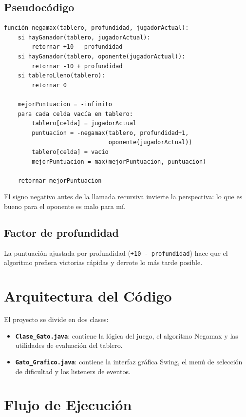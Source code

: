 \documentclass[12pt,a4paper]{article}
\begin{document}
\subsection{Pseudocódigo}
\begin{lstlisting}
función negamax(tablero, profundidad, jugadorActual):
    si hayGanador(tablero, jugadorActual):
        retornar +10 - profundidad
    si hayGanador(tablero, oponente(jugadorActual)):
        retornar -10 + profundidad
    si tableroLleno(tablero):
        retornar 0

    mejorPuntuacion = -infinito
    para cada celda vacía en tablero:
        tablero[celda] = jugadorActual
        puntuacion = -negamax(tablero, profundidad+1,
                              oponente(jugadorActual))
        tablero[celda] = vacío
        mejorPuntuacion = max(mejorPuntuacion, puntuacion)

    retornar mejorPuntuacion
\end{lstlisting}

El signo negativo antes de la llamada recursiva invierte la perspectiva: lo que es bueno para el oponente es malo para mí.

\subsection{Factor de profundidad}
La puntuación ajustada por profundidad (\texttt{+10 - profundidad}) hace que el algoritmo prefiera victorias rápidas y derrote lo más tarde posible.

\section{Arquitectura del Código}

El proyecto se divide en dos clases:

\begin{itemize}
  \item \textbf{\texttt{Clase\_Gato.java}}: contiene la lógica del juego, el algoritmo Negamax y las utilidades de evaluación del tablero.
  \item \textbf{\texttt{Gato\_Grafico.java}}: contiene la interfaz gráfica Swing, el menú de selección de dificultad y los listeners de eventos.
\end{itemize}

\section{Flujo de Ejecución}
\end{document}
